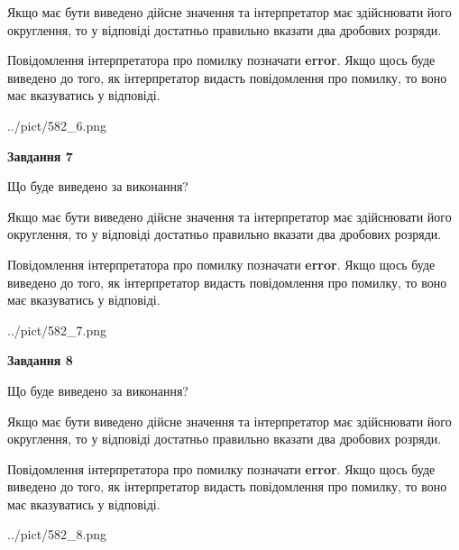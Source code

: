 \documentclass[12pt, ukrainian]{article}
\begin{document}
{\begin {Large}
Якщо має бути виведено дійсне значення та інтерпретатор має здійснювати його округлення, 
то у відповіді достатньо правильно вказати два дробових розряди.

Повідомлення інтерпретатора про помилку позначати \textbf{error}.
Якщо щось буде виведено до того, як інтерпретатор видасть повідомлення про помилку, 
то воно має вказуватись у відповіді. \par

\begin{center}
	{../pict/582_6.png}
\end{center}
\newpage

{\begin {center}\textbf{Завдання 7}\end {center}}\par
Що буде виведено за виконання? \par

Якщо має бути виведено дійсне значення та інтерпретатор має здійснювати його округлення, 
то у відповіді достатньо правильно вказати два дробових розряди.

Повідомлення інтерпретатора про помилку позначати \textbf{error}.
Якщо щось буде виведено до того, як інтерпретатор видасть повідомлення про помилку, 
то воно має вказуватись у відповіді. \par

\begin{center}
	{../pict/582_7.png}
\end{center}
\newpage

{\begin {center}\textbf{Завдання 8}\end {center}}\par
Що буде виведено за виконання? \par

Якщо має бути виведено дійсне значення та інтерпретатор має здійснювати його округлення, 
то у відповіді достатньо правильно вказати два дробових розряди.

Повідомлення інтерпретатора про помилку позначати \textbf{error}.
Якщо щось буде виведено до того, як інтерпретатор видасть повідомлення про помилку, 
то воно має вказуватись у відповіді. \par

\begin{center}
	{../pict/582_8.png}
\end{center}
\newpage


\end{Large}}
\end{document}
